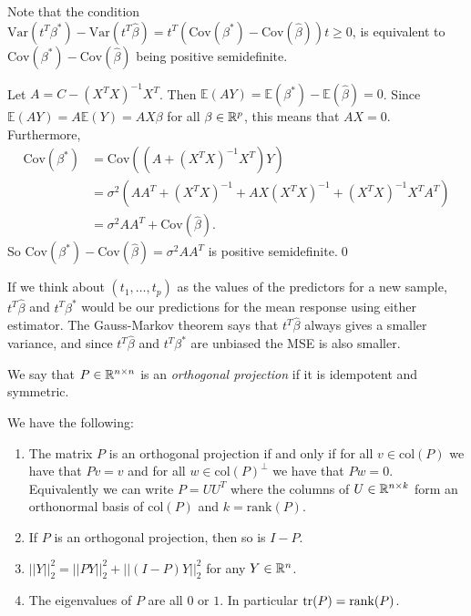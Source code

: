\documentclass{article}
\begin{document}
\pf Note that the condition $ \mathrm{Var}(t^T\beta^*) - \mathrm{Var}(t^T\hat\beta) = t^T(\mathrm{Cov}(\beta^*) - \mathrm{Cov}(\hat \beta))t\ge 0 $, is equivalent to $ \mathrm{Cov}(\beta^*) - \mathrm{Cov}(\hat\beta) $ being positive semidefinite.\par
Let $ A = C-(X^TX)^{-1}X^T $. Then $ \mathbb E(AY) = \mathbb E(\beta^*)-\mathbb E(\hat\beta) = 0 $. Since $ \mathbb E(AY) = A\mathbb E(Y) =AX\beta$ for all $ \beta\in \mathbb{R}^p $, this means that $ AX=0 $. Furthermore,
\begin{align*}
	\mathrm{Cov}(\beta^*) &= \mathrm{Cov}((A+(X^TX)^{-1}X^T)Y) \\
			      &= \sigma^2(AA^T +(X^TX)^{-1}+AX(X^TX)^{-1}+(X^TX)^{-1}X^TA^T) \\
			      &= \sigma^2 AA^T + \mathrm{Cov}(\hat \beta).
\end{align*}
So $ \mathrm{Cov}(\beta^*) - \mathrm{Cov}(\hat\beta) = \sigma^2 AA^T  $ is positive semidefinite.\qed
\begin{remark}
  If we think about $ (t_1,\dots, t_p) $ as the values of the predictors for a new sample, $ t^T\hat \beta $ and $ t^T\beta^* $ would be our predictions for the mean response using either estimator. The Gauss-Markov theorem says that $ t^T\hat\beta $ always gives a smaller variance, and since $ t^T\hat\beta $ and $ t^T\beta^* $ are unbiased the MSE is also smaller.
\end{remark}
\begin{definition}
	We say that $ P\in \mathbb{R}^{n\times n} $ is an \textit{orthogonal projection} if it is idempotent and symmetric.
\end{definition}
\begin{proposition}
	We have the following:
	\begin{enumerate}
		\item The matrix $ P $ is an orthogonal projection if and only if for all $ v\in \mathrm{col}(P) $ we have that $ Pv=v $ and for all $ w\in \mathrm{col}(P)^\perp $ we have that $ Pw = 0 $. Equivalently we can write $ P = UU^T $ where the columns of $ U\in \mathbb{R}^{n\times k} $ form an orthonormal basis of $ \mathrm{col}(P) $ and $ k=\mathrm{rank}(P) $.
		\item If $ P $ is an orthogonal projection, then so is $ I-P $.
		\item $ ||Y||_2^2 = ||PY||_2^2 +||(I-P)Y||_2^2 $ for any $ Y\in \mathbb{R}^ n $.
		\item The eigenvalues of $ P $ are all $ 0 $ or $ 1 $. In particular $ \tr(P)= \mathrm{rank}(P) $.
		\end{enumerate}
\end{proposition}
\end{document}
